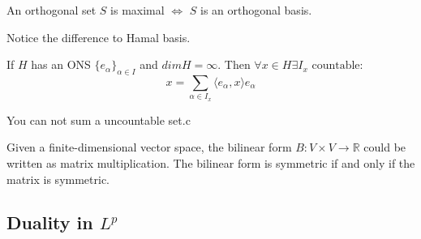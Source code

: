 \begin{theorem}
	An orthogonal set $S$ is maximal $\Leftrightarrow$ $S$ is an orthogonal basis.
\end{theorem}
\begin{remark}
Notice the difference to Hamal basis.	
\end{remark}

\begin{theorem}
	If $H$ has an ONS $\{e_\alpha\}_{\alpha \in I}$ and $dimH = \infty$. Then $\forall x \in H \exists I_x  \text{ countable}$:
	\begin{equation*}
		x = \sum_{\alpha \in I_x}\langle e_\alpha, x \rangle e_\alpha
	\end{equation*}
\end{theorem}
\begin{remark}
You can not sum a uncountable set.c	
\end{remark}

\begin{theorem}
Given a finite-dimensional vector space, the bilinear form $B: V \times V \rightarrow \mathbb{R}$ could be written as matrix multiplication. The bilinear form is symmetric if and only if the matrix is symmetric. 
\end{theorem}



\subsection*{Duality in $L^p$}
